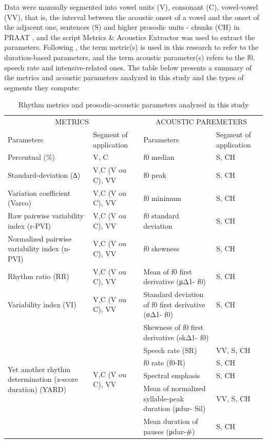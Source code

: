 Data were manually segmented into vowel units (V), consonant (C), vowel-vowel
(VV), that is, the interval between the acoustic onset of a vowel and the onset
of the adjacent one, sentences (S) and higher prosodic units - chunks (CH) in
PRAAT \citep{boersma2020}, and the script Metrics \& Acoustics Extractor
\citep{silva2020} was used to extract the parameters. Following \citet{silva2020},
the term metric(s) is used in this research to refer
to the duration-based parameters, and the term acoustic parameter(s) refers to
the f0, speech rate and intensive-related ones. The table below presents a
summary of the metrics and acoustic parameters analyzed in this study and the
types of segments they compute:

\begin{table}
\caption{Rhythm metrics and prosodic-acoustic parameters analyzed in this study}\label{leo-tab01}
\small
\begin{tabular}{@{}p{3cm}lp{3cm}l@{}}
\toprule
\multicolumn{2}{c}{METRICS\protect\footnotemark[1]} & \multicolumn{2}{c}{ACOUSTIC PAREMETERS}\\
Parameters & Segment of application & Parameters & Segment of application \\
\midrule 
Percentual (\%) & V, C & f0 median & S, CH \\
Standard-deviation (∆) & V,C (V ou C), VV & f0 peak & S, CH \\
Variation coefficient (Varco)\protect\footnotemark[2] & V,C (V ou C), VV &  f0 minimum & S, CH \\
Raw pairwise variability index (r-PVI)\protect\footnotemark[3] & V,C (V ou C), VV & f0 standard deviation & S, CH \\
Normalized pairwise variability index (n-PVI)\protect\footnotemark[4] & V,C (V ou C), VV & f0 skewness & S, CH \\
Rhythm ratio (RR)\protect\footnotemark[5] & V,C (V ou C), VV & Mean of f0 first derivative (μΔ1- f0) & S, CH \\
Variability index (VI)\protect\footnotemark[6] & V,C (V ou C), VV & Standard deviation of f0 first derivative (σΔ1- f0) & S, CH \\
\multirow{6}{=}{Yet another rhythm determination (z-score duration) (YARD)\protect\footnotemark[7]} & \multirow{6}{*}{V,C (V ou C), VV} & Skewness of f0 first derivative (skΔ1- f0) & \\
   &  & Speech rate (SR) & VV, S, CH \\
   &  & f0 rate (f0-R)  & S, CH \\
   &  & Spectral emphasis & S, CH \\
   &  & Mean of normalized syllable-peak duration (μdur- Sil) & VV, S, CH \\
   &  & Mean duration of pauses (μdur-\#) & S, CH \\
\bottomrule
\end{tabular}
\end{table}
